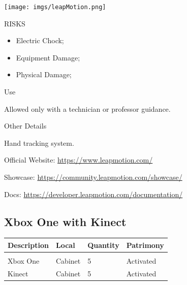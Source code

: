 \begin{multicols}{2}

\texttt{[image: imgs/leapMotion.png]}

\columnbreak

\begin{mdframed}[roundcorner=10pt, linecolor=red, linewidth=2pt]
\vspace{1em}
{\Large {\color{red}RISKS}}
\vspace{1em}

\begin{itemize}
    \item Electric Chock;
    \item Equipment Damage;
    \item Physical Damage;
\end{itemize}

\vspace{1em}
\end{mdframed}

\vspace{2em}

{\Large Use}
\vspace{1em}

Allowed only with a technician or professor guidance.
\end{multicols}

{\Large Other Details}
\vspace{1em}

Hand tracking system.

Official Website: \url{https://www.leapmotion.com/}

Showcase: \url{https://community.leapmotion.com/showcase/}

Docs: \url{https://developer.leapmotion.com/documentation/}
\newpage

\subsection{Xbox One with Kinect}
\begin{tabularx}{\textwidth}{ Y  Y  Y  Y }
    \textbf{Description} &  \textbf{Local} &  \textbf{Quantity} & \textbf{Patrimony}\\
    \hline \\
     Xbox One & Cabinet & 5 & Activated \\
     Kinect & Cabinet & 5 & Activated 
\end{tabularx}
\vspace{1cm}

